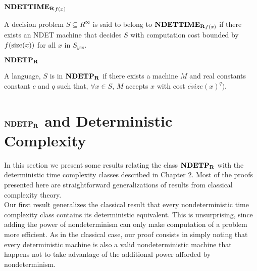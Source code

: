 \begin{definition}{$\mathbf{NDETTIME_R}_{f(x)}$}

  A decision problem $S \subseteq R^\infty$ is said to belong to
  $\mathbf{NDETTIME_R}_{f(x)}$ if there exists an NDET machine that decides $S$
  with computation cost bounded by $f(\text{size}(x))$ for all $x$ in
  $S_{yes}$.
  
\end{definition}

\begin{definition} $\mathbf{NDETP_R}$
  
  A language, $S$ is in $\mathbf{NDETP_R}$ if there exists a machine $M$ and
  real constants constant $c$ and $q$ such that, $\forall x \in S$,
  $M$ accepts $x$ with cost $c \dot size(x)^q)$.
  
\end{definition}

\section{$\mathbf{NDETP_R}$ and Deterministic Complexity}

In this section we present some results relating the class $\mathbf{NDETP_R}$
with the deterministic time complexity classes described in Chapter 2.
Most of the proofs presented here are straightforward generalizations
of results from classical complexity theory.\\

Our first result generalizes the classical result that every
nondeterministic time complexity class contains its deterministic
equivalent.  This is unsurprising, since adding the power of
nondeterminism can only make computation of a problem more efficient.
As in the classical case, our proof consists in simply noting that
every deterministic machine is also a valid nondeterministic machine
that happens not to take advantage of the additional power afforded by
nondeterminism.


